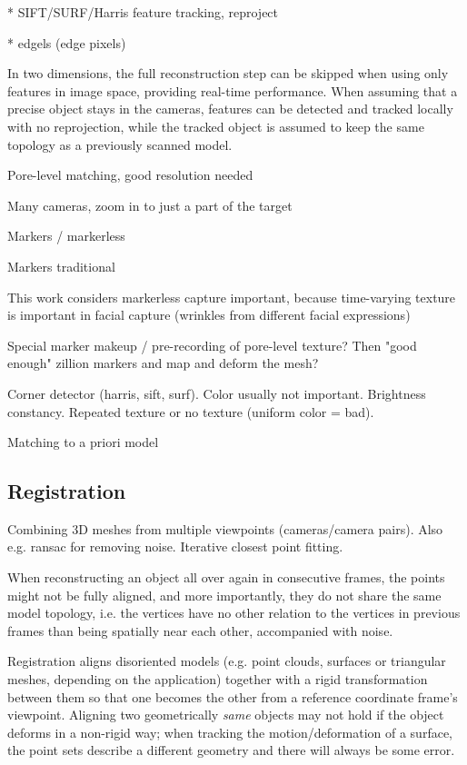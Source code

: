 * SIFT/SURF/Harris feature tracking, reproject

* edgels (edge pixels)

In two dimensions, the full reconstruction step can be skipped when using only features in image space, providing real-time performance. \cite{pilet2005real}
When assuming that a precise object stays in the cameras, features can be detected and tracked locally with no reprojection, while the tracked object is assumed to keep the same topology as a previously scanned model.

Pore-level matching, good resolution needed

Many cameras, zoom in to just a part of the target

Markers / markerless

Markers traditional


This work considers markerless capture important, because time-varying texture is important in facial capture (wrinkles from different facial expressions)

Special marker makeup / pre-recording of pore-level texture? Then "good enough" zillion markers and map and deform the mesh?

Corner detector (harris, sift, surf). Color usually not important. Brightness constancy. Repeated texture or no texture (uniform color = bad).

Matching to a priori model


\subsection{Registration} %

Combining 3D meshes from multiple viewpoints (cameras/camera pairs). Also e.g. ransac for removing noise. Iterative closest point fitting.


When reconstructing an object all over again in consecutive frames, the points might not be fully aligned, and more importantly, they do not share the same model topology, i.e. the vertices have no other relation to the vertices in previous frames than being spatially near each other, accompanied with noise. \cite{zhao2005alignment}

Registration aligns disoriented models (e.g. point clouds, surfaces or triangular meshes, depending on the application) together with a rigid transformation between them so that one becomes the other from a reference coordinate frame's viewpoint.
Aligning two geometrically \textit{same} objects may not hold if the object deforms in a non-rigid way; when tracking the motion/deformation of a surface, the point sets describe a different geometry and there will always be some error.

